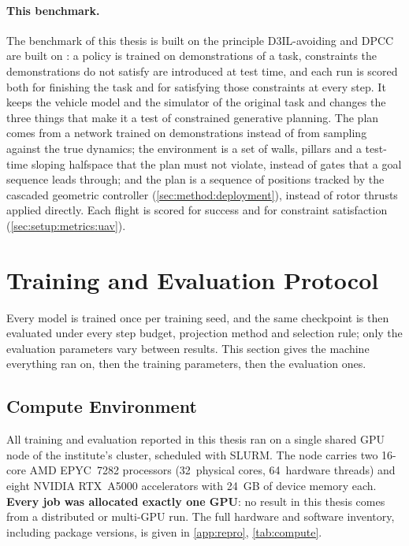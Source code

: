 \paragraph{This benchmark.} The benchmark of this thesis is built on the principle D3IL-avoiding and
\ac{DPCC} are built on \parencite{jia2024towards,romer2025diffusion}: a policy is trained on
demonstrations of a task, constraints the demonstrations do not satisfy are introduced at test time, and
each run is scored both for finishing the task and for satisfying those constraints at every step. It
keeps the vehicle model and the simulator of the original task and
changes the three things that make it a test of constrained generative planning. The plan comes
from a network trained on demonstrations instead of from sampling against the true dynamics; the
environment is a set of walls, pillars and a test-time sloping halfspace that the plan must not violate, instead of
gates that a goal sequence leads through; and the plan is a sequence of positions tracked by the
cascaded geometric controller (\autoref{sec:method:deployment}), instead of rotor thrusts applied
directly. Each flight is scored for success and for constraint satisfaction (\autoref{sec:setup:metrics:uav}).

\section{Training and Evaluation Protocol}\label{sec:setup:protocol}

Every model is trained once per training seed, and the same checkpoint is then evaluated under every step
budget, projection method and selection rule; only the evaluation parameters vary between results. This
section gives the machine everything ran on, then the training parameters, then the evaluation ones.

\subsection{Compute Environment}\label{sec:setup:protocol:compute}

All training and evaluation reported in this thesis ran on a single shared GPU node of the
institute's cluster, scheduled with SLURM. The node carries two 16-core AMD EPYC~7282 processors
(32~physical cores, 64~hardware threads) and eight NVIDIA RTX~A5000 accelerators with 24~GB of
device memory each. \textbf{Every job was allocated exactly one GPU}: no result in this thesis comes
from a distributed or multi-GPU run. The full hardware and software inventory, including package
versions, is given in \autoref{app:repro}, \autoref{tab:compute}.

